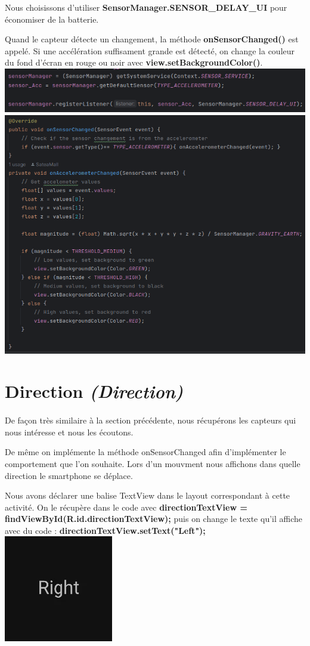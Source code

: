 \documentclass[a4paper]{article}
\begin{document}
\begin{multicols}{2}
                Nous choisissons d'utiliser \textbf{SensorManager.SENSOR\_DELAY\_UI} pour économiser de la batterie.

                Quand le capteur détecte un changement, la méthode \textbf{onSensorChanged()} est appelé. Si une accélération suffisament grande est détecté, on change la couleur du fond d'écran en rouge ou noir avec \textbf{view.setBackgroundColor()}.
                \includegraphics[width=.49\textwidth]{accelerometre/register}
                \includegraphics[width=.49\textwidth]{accelerometre/onSensorChanged}
        \section{Direction \emph{(Direction)}}
            \paragraph{}
                De façon très similaire à la section précédente, nous récupérons les capteurs qui nous intéresse et nous les écoutons.

                De même on implémente la méthode onSensorChanged afin d'implémenter le comportement que l'on souhaite. Lors d'un mouvment nous affichons dans quelle direction le smartphone se déplace. 
                
                Nous avons déclarer une balise TextView dans le layout correspondant à cette activité. On le récupère dans le code avec \textbf{directionTextView = findViewById(R.id.directionTextView);} puis on change le texte qu'il affiche avec du code : \textbf{directionTextView.setText("Left");}
                \includegraphics[width=.49\textwidth]{direction/screenshot}

\end{multicols}
\end{document}
